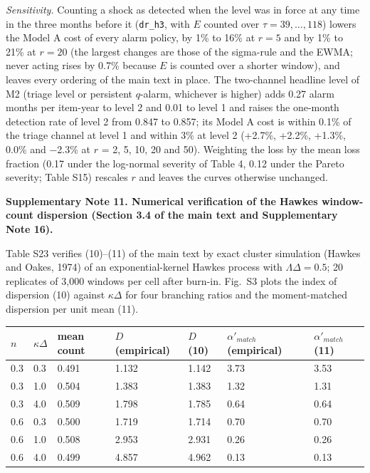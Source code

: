 \textit{Sensitivity.} Counting a shock as detected when the level was in force at any time in the three months before it (\texttt{dr\_h3}, with $E$ counted over $\tau = 39,\dots,118$) lowers the Model A cost of every alarm policy, by 1\% to 16\% at $r = 5$ and by 1\% to 21\% at $r = 20$ (the largest changes are those of the sigma-rule and the EWMA; never acting rises by 0.7\% because $E$ is counted over a shorter window), and leaves every ordering of the main text in place. The two-channel headline level of M2 (triage level or persistent $q$-alarm, whichever is higher) adds 0.27 alarm months per item-year to level 2 and 0.01 to level 1 and raises the one-month detection rate of level 2 from 0.847 to 0.857; its Model A cost is within 0.1\% of the triage channel at level 1 and within 3\% at level 2 (+2.7\%, +2.2\%, +1.3\%, 0.0\% and −2.3\% at $r$ = 2, 5, 10, 20 and 50). Weighting the loss by the mean loss fraction (0.17 under the log-normal severity of Table 4, 0.12 under the Pareto severity; Table S15) rescales $r$ and leaves the curves otherwise unchanged.

\textbf{Supplementary Note 11. Numerical verification of the Hawkes window-count dispersion (Section 3.4 of the main text and Supplementary Note 16).}

Table S23 verifies (10)–(11) of the main text by exact cluster simulation (Hawkes and Oakes, 1974) of an exponential-kernel Hawkes process with $\Lambda\Delta = 0.5$; 20 replicates of 3,000 windows per cell after burn-in. Fig.~S3 plots the index of dispersion (10) against $\kappa\Delta$ for four branching ratios and the moment-matched dispersion per unit mean (11).

\noindent\begin{minipage}{\linewidth}
\label{tab:S23}
\centering\footnotesize
\begin{tabular}{lllllll}
\toprule
$n$ & $\kappa\Delta$ & mean count & $D$ (empirical) & $D$ (10) & $\alpha'_{match}$ (empirical) & $\alpha'_{match}$ (11) \\ \midrule
0.3 & 0.3 & 0.491 & 1.132 & 1.142 & 3.73 & 3.53 \\
0.3 & 1.0 & 0.504 & 1.383 & 1.383 & 1.32 & 1.31 \\
0.3 & 4.0 & 0.509 & 1.798 & 1.785 & 0.64 & 0.64 \\
0.6 & 0.3 & 0.500 & 1.719 & 1.714 & 0.70 & 0.70 \\
0.6 & 1.0 & 0.508 & 2.953 & 2.931 & 0.26 & 0.26 \\
0.6 & 4.0 & 0.499 & 4.857 & 4.962 & 0.13 & 0.13 \\
\bottomrule
\end{tabular}
\end{minipage}
\vspace{14pt}

